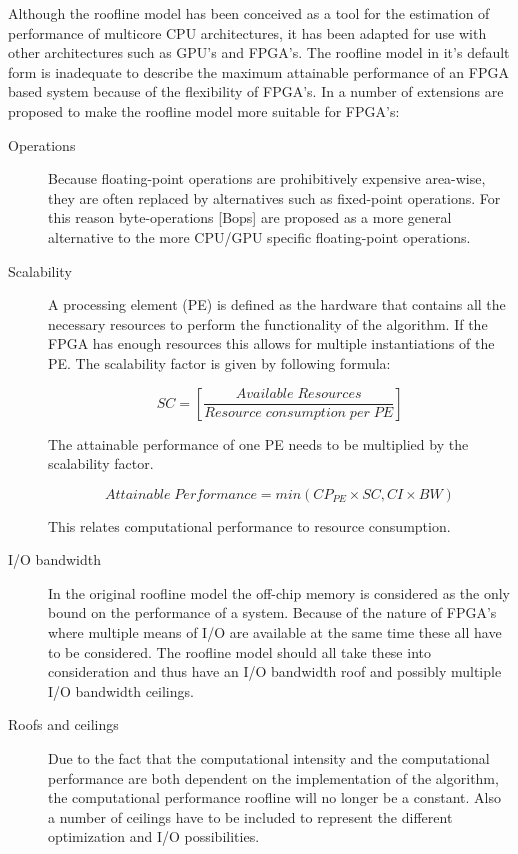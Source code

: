 Although the roofline model has been conceived as a tool for the estimation of performance of multicore CPU architectures, it has been adapted for use with other architectures such as GPU's\cite{spieringsembedded} and FPGA's\cite{spieringsembedded,daperformance}.
The roofline model in it's default form is inadequate to describe the maximum attainable performance of an FPGA based system because of the flexibility of FPGA's. In \cite{daperformance} a number of extensions are proposed to make the roofline model more suitable for FPGA's:
\begin{description}
	
	\item[Operations] Because floating-point operations are prohibitively expensive area-wise, they are often replaced by alternatives such as fixed-point operations. For this reason byte-operations [Bops] are proposed as a more general alternative to the more CPU/GPU specific floating-point operations.

	\item[Scalability] A processing element (PE) is defined as the hardware that contains all the necessary resources to perform the functionality of the algorithm. If the FPGA has enough resources this allows for multiple instantiations of the PE. The scalability factor is given by following formula:

	\begin{equation}
		SC = \left[\frac{Available\;Resources}{Resource\;consumption \; per \; PE}\right]
	\end{equation}

	The attainable performance of one PE needs to be multiplied by the scalability factor.

	\begin{equation}
		Attainable \; Performance = min(CP_{PE} \times SC, CI \times BW)
	\end{equation}

	This relates computational performance to resource consumption.

	\item[I/O bandwidth] In the original roofline model the off-chip memory is considered as the only bound on the performance of a system. Because of the nature of FPGA's where multiple means of I/O are available at the same time these all have to be considered. The roofline model should all take these into consideration and thus have an I/O bandwidth roof and possibly multiple I/O bandwidth ceilings.

	\item[Roofs and ceilings] Due to the fact that the computational intensity and the computational performance are both dependent on the implementation of the algorithm, the computational performance roofline will no longer be a constant. Also a number of ceilings have to be included to represent the different optimization and I/O possibilities.


\end{description}

